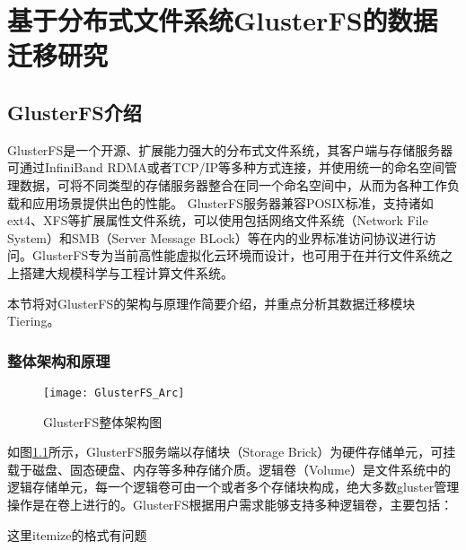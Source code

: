 \chapter{基于分布式文件系统GlusterFS的数据迁移研究}

\section{GlusterFS介绍}

GlusterFS\cite{GlusterFS}是一个开源、扩展能力强大的分布式文件系统，其客户端与存储服务器可通过InfiniBand RDMA或者TCP/IP等多种方式连接，并使用统一的命名空间管理数据，可将不同类型的存储服务器整合在同一个命名空间中，从而为各种工作负载和应用场景提供出色的性能。 GlusterFS服务器兼容POSIX标准，支持诸如ext4、XFS等{\color{orange}扩展属性文件系统}，可以使用包括网络文件系统（Network File System）和SMB（Server Message BLock）等在内的业界标准访问协议进行访问。GlusterFS专为当前高性能虚拟化云环境而设计，也可用于在并行文件系统之上搭建大规模科学与工程计算文件系统。 

本节将对GlusterFS的架构与原理作简要介绍，并重点分析其数据迁移模块Tiering。
\subsection{整体架构和原理}
\begin{figure}[htp]
\centering
\texttt{[image: GlusterFS\_Arc]}
\caption{GlusterFS整体架构图}
\label{fig:GlusterFS_Arc}
\end{figure}
如图\ref{fig:GlusterFS_Arc}所示，GlusterFS服务端以存储块（Storage Brick）为硬件存储单元，可挂载于磁盘、固态硬盘、内存等多种存储介质。逻辑卷（Volume）是文件系统中的逻辑存储单元，每一个逻辑卷可由一个或者多个存储块构成，绝大多数gluster管理操作是在卷上进行的。GlusterFS根据用户需求能够支持多种逻辑卷，主要包括：

{\color{red}这里itemize的格式有问题}

